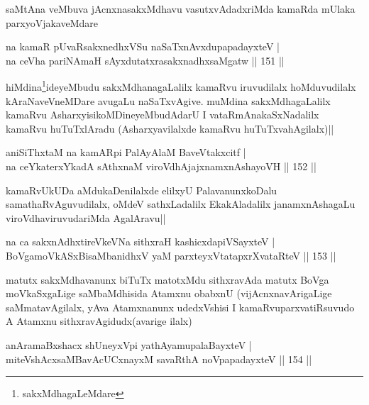 \begin{artha}
saMtAna veMbuva jAcnxnasakxMdhavu vasutxvAdadxriMda kamaRda mUlaka parxyoVjakaveMdare
\end{artha}

\begin{shl}
na kamaR pUvaRsakxnedhxVSu naSaTxnAvxdupapadayxteV |\\
na ceVha pariNAmaH sAyxdutatxrasakxnadhxsaMgatw \hfill || 151 ||
\end{shl}

\begin{artha}
hiMdina\footnote{sakxMdhagaLeMdare}ideyeMbudu sakxMdhanagaLalilx kamaRvu iruvudilalx hoMduvudilalx kAraNaveVneMDare avugaLu naSaTxvAgive. muMdina sakxMdhagaLalilx kamaRvu AsharxyisikoMDineyeMbudAdarU I vataRmAnakaSxNadalilx kamaRvu huTuTxlAradu (Asharxyavilalxde kamaRvu huTuTxvahAgilalx)||
\end{artha}


\begin{shl}
aniSiThxtaM na kamARpi PalAyAlaM BaveVtakxcitf |\\
na ceYkaterxYkadA sAthxnaM viroVdhAjajxnamxnAshayoVH \hfill || 152 ||
\end{shl}

\begin{artha}
kamaRvUkUDa aMdukaDenilalxde elilxyU PalavanunxkoDalu samathaRvAguvudilalx, oMdeV sathxLadalilx EkakAladalilx janamxnAshagaLu viroVdhaviruvudariMda AgalAravu||
\end{artha}

\begin{shl}
na ca sakxnAdhxtireVkeVNa sithxraH kashicxdapiVSayxteV |\\
BoVgamoVkASxBisaMbanidhxV yaM parxteyxVtatapxrXvataRteV \hfill || 153 ||
\end{shl}

\begin{artha}
matutx sakxMdhavanunx biTuTx matotxMdu sithxravAda matutx BoVga moVkaSxgaLige saMbaMdhisida Atamxnu obabxnU (vijAcnxnavArigaLige saMmatavAgilalx, yAva Atamxnanunx udedxVshisi I kamaRvuparxvatiRsuvudo A Atamxnu sithxravAgidudx(avarige ilalx)
\end{artha}


\begin{shl}
anAramaBxshacx shUneyxV\s pi yathA\s yamupalaBayxteV |\\
miteVshAcxsaMBavAcUCxnayxM savaRthA noVpapadayxteV \hfill || 154 ||
\end{shl}

